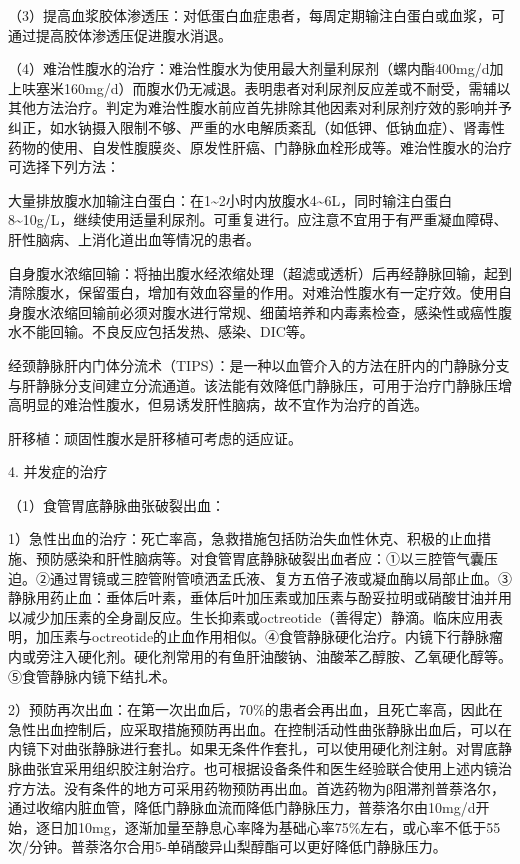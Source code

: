 （3）提高血浆胶体渗透压：对低蛋白血症患者，每周定期输注白蛋白或血浆，可通过提高胶体渗透压促进腹水消退。

（4）难治性腹水的治疗：难治性腹水为使用最大剂量利尿剂（螺内酯400mg/d加上呋塞米160mg/d）而腹水仍无减退。表明患者对利尿剂反应差或不耐受，需辅以其他方法治疗。判定为难治性腹水前应首先排除其他因素对利尿剂疗效的影响并予纠正，如水钠摄入限制不够、严重的水电解质紊乱（如低钾、低钠血症）、肾毒性药物的使用、自发性腹膜炎、原发性肝癌、门静脉血栓形成等。难治性腹水的治疗可选择下列方法：

大量排放腹水加输注白蛋白：在1\textasciitilde{}2小时内放腹水4\textasciitilde{}6L，同时输注白蛋白8\textasciitilde{}10g/L，继续使用适量利尿剂。可重复进行。应注意不宜用于有严重凝血障碍、肝性脑病、上消化道出血等情况的患者。

自身腹水浓缩回输：将抽出腹水经浓缩处理（超滤或透析）后再经静脉回输，起到清除腹水，保留蛋白，增加有效血容量的作用。对难治性腹水有一定疗效。使用自身腹水浓缩回输前必须对腹水进行常规、细菌培养和内毒素检查，感染性或癌性腹水不能回输。不良反应包括发热、感染、DIC等。

经颈静脉肝内门体分流术（TIPS）：是一种以血管介入的方法在肝内的门静脉分支与肝静脉分支间建立分流通道。该法能有效降低门静脉压，可用于治疗门静脉压增高明显的难治性腹水，但易诱发肝性脑病，故不宜作为治疗的首选。

肝移植：顽固性腹水是肝移植可考虑的适应证。

4. 并发症的治疗

（1）食管胃底静脉曲张破裂出血：

1）急性出血的治疗：死亡率高，急救措施包括防治失血性休克、积极的止血措施、预防感染和肝性脑病等。对食管胃底静脉破裂出血者应：①以三腔管气囊压迫。②通过胃镜或三腔管附管喷洒孟氏液、复方五倍子液或凝血酶以局部止血。③静脉用药止血：垂体后叶素，垂体后叶加压素或加压素与酚妥拉明或硝酸甘油并用以减少加压素的全身副反应。生长抑素或octreotide（善得定）静滴。临床应用表明，加压素与octreotide的止血作用相似。④食管静脉硬化治疗。内镜下行静脉瘤内或旁注入硬化剂。硬化剂常用的有鱼肝油酸钠、油酸苯乙醇胺、乙氧硬化醇等。⑤食管静脉内镜下结扎术。

2）预防再次出血：在第一次出血后，70\%的患者会再出血，且死亡率高，因此在急性出血控制后，应采取措施预防再出血。在控制活动性曲张静脉出血后，可以在内镜下对曲张静脉进行套扎。如果无条件作套扎，可以使用硬化剂注射。对胃底静脉曲张宜采用组织胶注射治疗。也可根据设备条件和医生经验联合使用上述内镜治疗方法。没有条件的地方可采用药物预防再出血。首选药物为β阻滞剂普萘洛尔，通过收缩内脏血管，降低门静脉血流而降低门静脉压力，普萘洛尔由10mg/d开始，逐日加10mg，逐渐加量至静息心率降为基础心率75\%左右，或心率不低于55次/分钟。普萘洛尔合用5-单硝酸异山梨醇酯可以更好降低门静脉压力。

